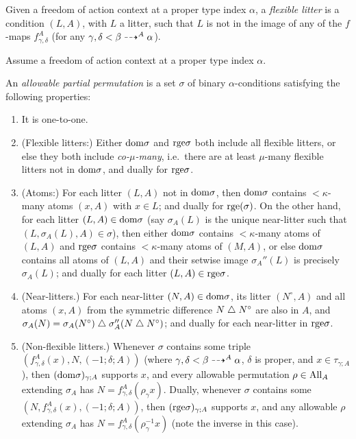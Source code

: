 \begin{definition}
  \label{def:flexible-condition}
  Given a freedom of action context at a proper type index $\alpha$, a \emph{flexible litter} is a condition $(L,A)$, with $L$ a litter, such that $L$ is not in the image of any of the $f$-maps $f^A_{\gamma,\delta}$ (for any $\gamma,\delta < \beta \dashrightarrow^A \alpha$).
\end{definition}

\begin{definition}
  \label{def:allowable-partial-perm}
  \leanok
  Assume a freedom of action context at a proper type index $\alpha$.

  An \emph{allowable partial permutation} is a set $\sigma$ of binary $\alpha$-conditions satisfying the following properties:
  \begin{enumerate}
  \item It is one-to-one.
  \item (Flexible litters:)  Either $\mathrm{dom} \sigma$ and $\mathrm{rge} \sigma$ both include all flexible litters, or else they both include \emph{co-$\mu$-many}, i.e.\ there are at least $\mu$-many flexible litters not in $\mathrm{dom} \sigma$, and dually for $\mathrm{rge} \sigma$.
  \item (Atoms:) For each litter $(L,A)$ not in $\mathrm{dom} \sigma$, then $\mathrm{dom} \sigma$ contains $<\kappa$-many atoms $(x,A)$ with $x \in L$; and dually for $\mathrm{rge}(\sigma)$.  On the other hand, for each litter $(L,A) \in \mathrm{dom} \sigma$ (say $\sigma_A(L)$ is the unique near-litter such that $(L,\sigma_A(L),A) \in \sigma$), then either $\mathrm{dom} \sigma$ contains $<\kappa$-many atoms of $(L,A)$ and $\mathrm{rge} \sigma$ contains $<\kappa$-many atoms of $(M,A)$, or else $\mathrm{dom} \sigma$ contains all atoms of $(L,A)$ and their setwise image $\sigma_A''(L)$ is precisely $\sigma_A(L)$; and dually for each litter $(L,A) \in \mathrm{rge} \sigma$.
  \item (Near-litters.) For each near-litter $(N,A) \in \mathrm{dom} \sigma$, its litter $(N^\circ,A)$ and all atoms $(x,A)$ from the symmetric difference $N \mathrel{\triangle} N^\circ$ are also in $A$, and $\sigma_A(N) = \sigma_A(N^\circ) \mathrel{\triangle} \sigma_A''(N \mathrel{\triangle} N^\circ)$; and dually for each near-litter in $\mathrm{rge} \sigma$.
  \item (Non-flexible litters.) Whenever $\sigma$ contains some triple $(f^A_{\gamma,\delta}(x),N,(-1;\delta;A))$ (where $\gamma,\delta < \beta \dashrightarrow^A \alpha$, $\delta$ is proper, and $x \in \tau_{\gamma;A}$), then $(\mathrm{dom} \sigma)_{\gamma;A}$ supports $x$, and every allowable permutation $\rho \in \mathrm{All}_A$ extending $\sigma_A$ has $N = f^A_{\gamma,\delta}(\rho_\gamma x)$.  Dually, whenever $\sigma$ contains some $(N,f^A_{\gamma,\delta}(x),(-1;\delta;A))$, then $(\mathrm{rge} \sigma)_{\gamma;A}$ supports $x$, and any allowable $\rho$ extending $\sigma_A$ has $N = f^A_{\gamma,\delta}(\rho^{-1}_\gamma x)$ (note the inverse in this case).
  \end{enumerate}


\end{definition}

